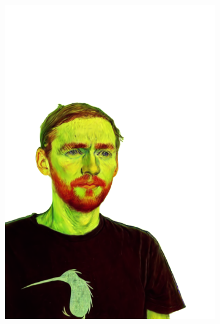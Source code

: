 \begin{figure}[ht]
\begin{subfigure}{0.08\linewidth}
        \includegraphics[width=\textwidth]{Figures/results/low/simon_vangogh/11_render.png}
	\end{subfigure}
	\begin{subfigure}{0.08\linewidth}%

\end{subfigure}
\end{figure}
